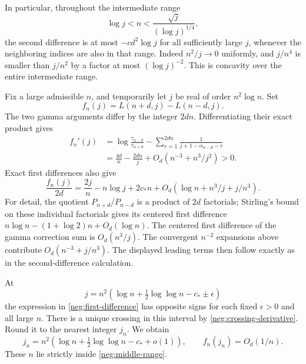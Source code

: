 \documentclass[11pt]{article}
\numberwithin{equation}{section}
\theoremstyle{definition}
\begin{document}
In particular, throughout the intermediate range
\begin{equation}
 \log j<n<\frac{\sqrt j}{(\log j)^{1/4}},
 \label{neg:middle-range}
\end{equation}
the second difference is at most \(-c d^2\log j\) for all
sufficiently large \(j\), whenever the neighboring indices
are also in that range.  Indeed \(n^2/j\to0\) uniformly,
and \(j/n^4\) is smaller than \(j/n^2\) by a factor at most
\((\log j)^{-2}\).  This is concavity over the entire
intermediate range.

Fix a large admissible \(n\), and temporarily let \(j\) be
real of order \(n^2\log n\).  Set
\[
 f_n(j)=L(n+d,j)-L(n-d,j).
 \]
The two gamma arguments differ by the integer \(2dn\).
Differentiating their exact product gives
\begin{align}
 f_n'(j)
 &=\log\frac{\tau_{n-d}}{\tau_{n+d}}
   -\sum_{r=1}^{2dn}
       \frac1{j+1-\alpha_{n-d}-r}\\
 &=\frac{4d}{n}-\frac{2dn}{j}
       +O_d(n^{-3}+n^3/j^2)>0 .
 \label{neg:crossing-derivative}
\end{align}
Exact first differences also give
\begin{equation}
 \frac{f_n(j)}{2d}
 =\frac{2j}{n}-n\log j+2c_*n
       +O_d(\log n+n^3/j+j/n^3).
 \label{neg:first-difference}
\end{equation}
For detail, the quotient \(P_{n+d}/P_{n-d}\) is a
product of \(2d\) factorials; Stirling's bound on these
individual factorials gives its centered first difference
\(n\log n-(1+\log2)n+O_d(\log n)\).
The centered first difference of the gamma correction sum
is \(O_d(n^3/j)\).  The convergent \(n^{-2}\) expansions
above contribute \(O_d(n^{-3}+j/n^3)\).
The displayed leading terms then follow exactly as in the
second-difference calculation.

At
\[
 j=n^2\left(\log n+\tfrac12\log\log n-c_*\pm\epsilon\right)
 \]
the expression in \eqref{neg:first-difference} has opposite
signs for each fixed \(\epsilon>0\) and all large \(n\).
There is a unique crossing in this interval by
\eqref{neg:crossing-derivative}.  Round it to the nearest
integer \(j_n\).  We obtain
\begin{equation}
 j_n=n^2\left(\log n+\tfrac12\log\log n-c_*+o(1)\right),
 \qquad f_n(j_n)=O_d(1/n).
 \label{neg:selected-order}
\end{equation}
These \(n\) lie strictly inside \eqref{neg:middle-range}.
\end{document}
